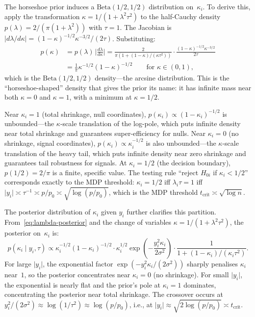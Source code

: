 \documentclass[12pt]{article}
\newcommand{\abs}[1]{\lvert #1 \rvert}
\newcommand{\tcrit}{t_{\mathrm{crit}}}
\begin{document}
The horseshoe prior induces a $\mathrm{Beta}(1/2, 1/2)$ distribution on~$\kappa_i$. To derive this, apply the transformation $\kappa = 1/(1+\lambda^2\tau^2)$ to the half-Cauchy density $p(\lambda) = 2/(\pi(1+\lambda^2))$ with $\tau = 1$. The Jacobian is $\abs{d\lambda/d\kappa} = (1-\kappa)^{-1/2}\kappa^{-3/2}/(2\tau)$. Substituting:
\begin{align}
  p(\kappa) &= p(\lambda)\, \abs{\frac{d\lambda}{d\kappa}}
  = \frac{2}{\pi(1 + (1-\kappa)/(\kappa\tau^2))} \cdot \frac{(1-\kappa)^{-1/2}\kappa^{-3/2}}{2\tau} \nonumber\\
  &= \frac{1}{\pi} \kappa^{-1/2}(1-\kappa)^{-1/2}
  \qquad\text{for } \kappa \in (0,1), \label{eq:beta-derivation}
\end{align}
which is the $\mathrm{Beta}(1/2, 1/2)$ density---the arcsine distribution. This is the ``horseshoe-shaped'' density that gives the prior its name: it has infinite mass near both $\kappa = 0$ and $\kappa = 1$, with a minimum at $\kappa = 1/2$.

Near $\kappa_i = 1$ (total shrinkage, null coordinates), $p(\kappa_i) \propto (1-\kappa_i)^{-1/2}$ is unbounded---the $\kappa$-scale translation of the log-pole, which puts infinite density near total shrinkage and guarantees super-efficiency for nulls. Near $\kappa_i = 0$ (no shrinkage, signal coordinates), $p(\kappa_i) \propto \kappa_i^{-1/2}$ is also unbounded---the $\kappa$-scale translation of the heavy tail, which puts infinite density near zero shrinkage and guarantees tail robustness for signals. At $\kappa_i = 1/2$ (the decision boundary), $p(1/2) = 2/\pi$ is a finite, specific value. The testing rule ``reject $H_{0i}$ if $\kappa_i < 1/2$'' corresponds exactly to the MDP threshold: $\kappa_i = 1/2$ iff $\lambda_i\tau = 1$ iff $\abs{y_i} \asymp \tau^{-1} \asymp p/p_0 \asymp \sqrt{\log(p/p_0)}$, which is the MDP threshold $\tcrit \asymp \sqrt{\log n}$.

The posterior distribution of $\kappa_i$ given $y_i$ further clarifies this partition. From~\eqref{eq:lambda-posterior} and the change of variables $\kappa = 1/(1+\lambda^2\tau^2)$, the posterior on~$\kappa_i$ is:
\begin{equation}\label{eq:kappa-posterior}
  p(\kappa_i \mid y_i, \tau)
  \propto \kappa_i^{-1/2}(1-\kappa_i)^{-1/2}
  \cdot \kappa_i^{1/2}
  \exp\!\left(-\frac{y_i^2 \kappa_i}{2\sigma^2}\right)
  \cdot \frac{1}{1 + (1-\kappa_i)/(\kappa_i\tau^2)}.
\end{equation}
For large $\abs{y_i}$, the exponential factor $\exp(-y_i^2\kappa_i/(2\sigma^2))$ sharply penalises $\kappa_i$ near~$1$, so the posterior concentrates near $\kappa_i = 0$ (no shrinkage). For small $\abs{y_i}$, the exponential is nearly flat and the prior's pole at $\kappa_i = 1$ dominates, concentrating the posterior near total shrinkage. The crossover occurs at $y_i^2/(2\sigma^2) \approx \log(1/\tau^2) \approx \log(p/p_0)$, i.e., at $\abs{y_i} \approx \sqrt{2\log(p/p_0)} \asymp \tcrit$.
\end{document}
